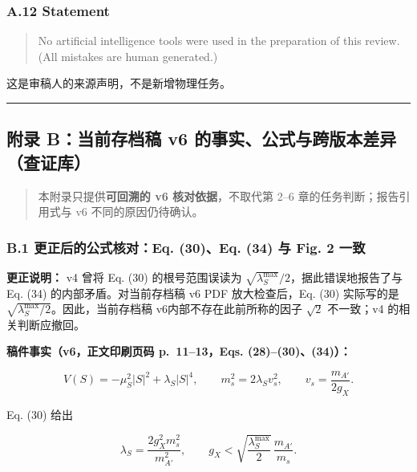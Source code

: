 \documentclass[
]{article}
\begin{document}
\subsubsection{A.12 Statement}\label{a.12-statement}

\begin{quote}
No artificial intelligence tools were used in the preparation of this
review. (All mistakes are human generated.)
\end{quote}

这是审稿人的来源声明，不是新增物理任务。

\begin{center}\rule{0.5\linewidth}{0.5pt}\end{center}

\subsection{附录 B：当前存档稿 v6
的事实、公式与跨版本差异（查证库）}\label{ux9644ux5f55-bux5f53ux524dux5b58ux6863ux7a3f-v6-ux7684ux4e8bux5b9eux516cux5f0fux4e0eux8de8ux7248ux672cux5deeux5f02ux67e5ux8bc1ux5e93}

\begin{quote}
本附录只提供\textbf{可回溯的 v6 核对依据}，不取代第 2--6
章的任务判断；报告引用式与 v6 不同的原因仍待确认。
\end{quote}

\subsubsection{B.1 更正后的公式核对：Eq. (30)、Eq. (34) 与 Fig. 2
一致}\label{b.1-ux66f4ux6b63ux540eux7684ux516cux5f0fux6838ux5bf9eq.-30eq.-34-ux4e0e-fig.-2-ux4e00ux81f4}

\textbf{更正说明：} v4 曾将 Eq. (30) 的根号范围误读为
\(\sqrt{\lambda_S^{\max}}/2\)，据此错误地报告了与 Eq. (34)
的内部矛盾。对当前存档稿 v6 PDF 放大检查后，Eq. (30) 实际写的是
\(\sqrt{\lambda_S^{\max}/2}\)。因此，当前存档稿
v6内部不存在此前所称的因子 \(\sqrt{2}\) 不一致；v4 的相关判断应撤回。

\textbf{稿件事实（v6，正文印刷页码 p.~11--13，Eqs. (28)--(30)、(34)）：}

\[
V(S)=-\mu_S^2|S|^2+\lambda_S|S|^4,\qquad
m_s^2=2\lambda_S v_s^2,\qquad
v_s=\frac{m_{A'}}{2g_X}.
\]

Eq. (30) 给出

\[
\lambda_S=\frac{2g_X^2m_s^2}{m_{A'}^2},\qquad
 g_X<\sqrt{\frac{\lambda_S^{\max}}{2}}\,\frac{m_{A'}}{m_s}.
\tag{30}
\]
\end{document}
